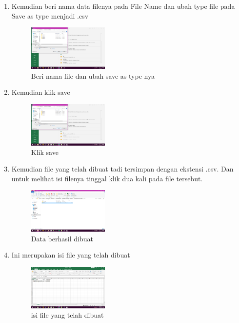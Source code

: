 \begin{enumerate}
\begin{enumerate}
\begin{figure}[H]
	\end{figure} 
\item Kemudian beri nama data filenya pada File Name dan ubah type file pada Save as type menjadi .csv
 	\begin{figure}[H]
			\includegraphics[width=4cm]{figures/1184065/5.png}
			\centering
			\caption{Beri nama file dan ubah save as type nya}
	\end{figure}
\item Kemudian klik save
 	\begin{figure}[H]
			\includegraphics[width=4cm]{figures/1184065/6.png}
			\centering
			\caption{Klik save}
	\end{figure} 
\item Kemudian file yang telah dibuat tadi tersimpan dengan ekstensi .csv. Dan untuk melihat isi filenya tinggal klik dua kali pada file tersebut.
	\begin{figure}[H]
			\includegraphics[width=4cm]{figures/1184065/7.png}
			\centering
			\caption{Data berhasil dibuat}
	\end{figure}
\item Ini merupakan isi file yang telah dibuat
	\begin{figure}[H]
			\includegraphics[width=4cm]{figures/1184065/8.png}
			\centering
			\caption{isi file yang telah dibuat}
	\end{figure}

\end{enumerate}
\end{enumerate}
